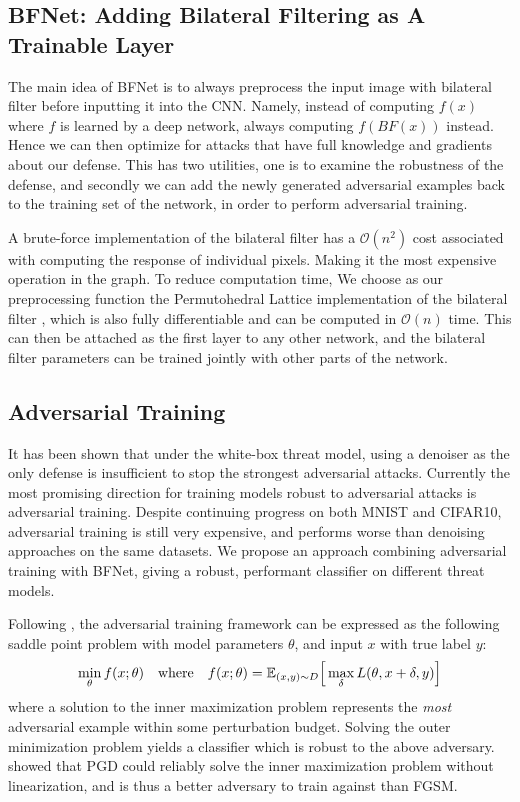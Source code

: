 \documentclass{article} %
\begin{document}
\subsection{BFNet: Adding Bilateral Filtering as A Trainable Layer}
The main idea of BFNet is to always preprocess the input image with bilateral filter before inputting it into the CNN. Namely, instead of computing $f(x)$ where $f$ is learned by a deep network, always computing $f(BF(x))$ instead. Hence we can then optimize for attacks that have full knowledge and gradients about our defense. This has two utilities, one is to examine the robustness of the defense, and secondly we can add the newly generated adversarial examples back to the training set of the network, in order to perform adversarial training.

A brute-force implementation of the bilateral filter has a $\mathcal{O}(n^2)$ cost associated with computing the response of individual pixels. Making it the most expensive operation in the graph. To reduce computation time, We choose as our preprocessing function the Permutohedral Lattice implementation of the bilateral filter \citep{adams2010fast}, which is also fully differentiable and can be computed in $\mathcal{O}(n)$ time. This can then be attached as the first layer to any other network, and the bilateral filter parameters can be trained jointly with other parts of the network.%

\subsection{Adversarial Training} 
It has been shown that under the white-box threat model, using a denoiser as the only defense is insufficient to stop the strongest adversarial attacks. 
Currently the most promising direction for training models robust to adversarial attacks is adversarial training. Despite continuing progress on both MNIST and CIFAR10, adversarial training is still very expensive, and performs worse than denoising approaches on the same datasets. We propose an approach combining adversarial training with BFNet, giving a robust, performant classifier on different threat models.

Following \citep{madry2017towards,athalye2018obfuscated,carlini2017towards}, the adversarial training framework can be expressed as the following saddle point problem with model parameters $\theta$, and input $x$ with true label $y$:
\[
\min_{\theta} f(x;\theta) \quad \textnormal{where} \quad f(x;\theta) = \mathbb{E}_{(x, y)\sim D} \Big[ \max_{\delta} L(\theta, x + \delta, y)\Big]
\]
where a solution to the inner maximization problem represents the \textit{most} adversarial example within some perturbation budget. Solving the outer minimization problem yields a classifier which is robust to the above adversary. \citep{madry2017towards} showed that PGD could reliably solve the inner maximization problem without linearization, and is thus a better adversary to train against than FGSM. 
\end{document}
